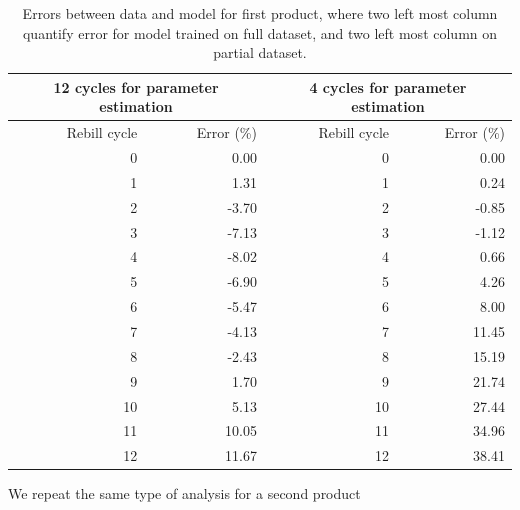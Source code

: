 \documentclass[paper=a4, fontsize=11pt]{scrartcl} %
\numberwithin{equation}{section} %
\numberwithin{figure}{section} %
\numberwithin{table}{section} %
\begin{document}
\begin{table}[ht]
	\centering
	\begin{tabular}{rrrr}
		\hline
		\multicolumn{2}{c|}{12 cycles for parameter estimation} & \multicolumn{2}{c}{4 cycles for parameter estimation} \\
		\hline
		Rebill cycle & Error (\%) & Rebill cycle &  Error (\%) \\ 
		\hline
		0 & 0.00 & 0 & 0.00\\ 
		1 & 1.31 & 1 & 0.24\\ 
		2 & -3.70 & 2 & -0.85 \\ 
		3 & -7.13 & 3 & -1.12 \\ 
		4 & -8.02 & 4 & 0.66 \\ 
		5 & -6.90 & 5 & 4.26 \\ 
		6 & -5.47 & 6 & 8.00 \\ 
		7 & -4.13 & 7 & 11.45  \\ 
		8 & -2.43 & 8 & 15.19 \\ 
		9 & 1.70 & 9 & 21.74  \\ 
		10 & 5.13 & 10 & 27.44  \\ 
		11 & 10.05 & 11 & 34.96 \\ 
		12 & 11.67 & 12 & 38.41 \\ 
		\hline
	\end{tabular}
	\caption{Errors between data and model for first product, where two left most column quantify error for model trained on full dataset, and two left most column on partial dataset.}
	\label{VR}
\end{table}

We repeat the same type of analysis for a second product
\end{document}
